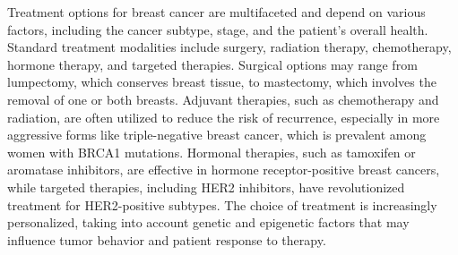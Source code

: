 Treatment options for breast cancer are multifaceted and depend on various
factors, including the cancer subtype, stage, and the patient's overall health.
Standard treatment modalities include surgery, radiation therapy, chemotherapy,
hormone therapy, and targeted therapies.
Surgical options may range from lumpectomy, which conserves breast tissue, to
mastectomy, which involves the removal of one or both
breasts\supercite{metcalfe_contralateral_2014,wu_breast_2014}.
Adjuvant therapies, such as chemotherapy and radiation, are often utilized to
reduce the risk of recurrence, especially in more aggressive forms like
triple-negative breast cancer, which is prevalent among women with BRCA1
mutations\supercite{metcalfe_contralateral_2014}.
Hormonal therapies, such as tamoxifen or aromatase inhibitors, are effective in
hormone receptor-positive breast cancers, while targeted therapies, including
HER2 inhibitors, have revolutionized treatment for HER2-positive
subtypes\supercite{eccles_critical_2013,pace_breast_2016}.
The choice of treatment is increasingly personalized, taking into account
genetic and epigenetic factors that may influence tumor behavior and patient
response to therapy\supercite{khakpour_methylomics_2017}.

